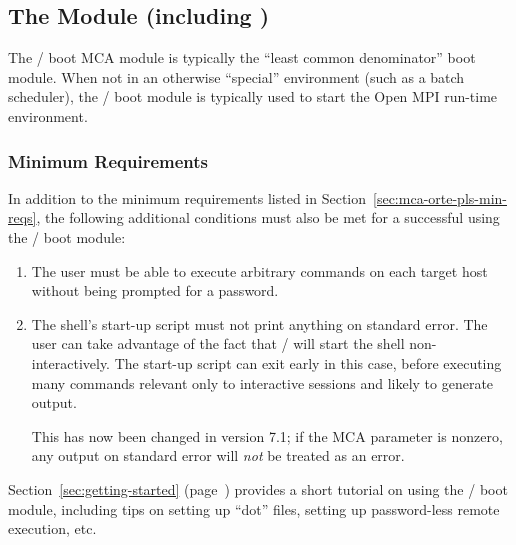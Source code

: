 
\subsection{The  Module (including )}

The / boot MCA module is typically the ``least
common denominator'' boot module.  When not in an otherwise
``special'' environment (such as a batch scheduler), the
/ boot module is typically used to start the Open MPI
run-time environment.


\subsubsection{Minimum Requirements}

In addition to the minimum requirements listed in
Section~\ref{sec:mca-orte-pls-min-reqs}, the following additional
conditions must also be met for a successful  using the
 /  boot module:

\begin{enumerate}
\item The user must be able to execute arbitrary commands on each
  target host without being prompted for a password.
  
\item The shell's start-up script must not print anything on standard
  error. The user can take advantage of the fact that  /
   will start the shell non-interactively. The start-up
  script can exit early in this case, before executing many commands
  relevant only to interactive sessions and likely to generate output.

  This has now been changed in version 7.1; if the MCA parameter
   is nonzero, any output
  on standard error will {\em not} be treated as an error.
\end{enumerate}

Section~\ref{sec:getting-started} (page~\pageref{sec:getting-started})
provides a short tutorial on using the  /  boot
module, including tips on setting up ``dot'' files, setting up
password-less remote execution, etc.

